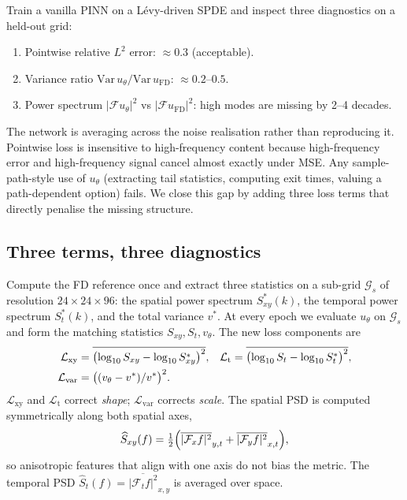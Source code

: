 \documentclass[10pt]{elsarticle}
\begin{document}
Train a vanilla PINN on a L\'evy-driven SPDE and inspect three
diagnostics on a held-out grid:
\begin{enumerate}
\item Pointwise relative \(L^2\) error: \(\approx 0.3\) (acceptable).
\item Variance ratio
\(\mathrm{Var}\,u_\theta / \mathrm{Var}\,u_{\mathrm{FD}}\):
\(\approx 0.2\)--\(0.5\).
\item Power spectrum \(|\mathcal F u_\theta|^2\) vs
\(|\mathcal F u_{\mathrm{FD}}|^2\): high modes are missing by 2--4
decades.
\end{enumerate}
The network is averaging across the noise realisation rather than
reproducing it. Pointwise loss is insensitive to high-frequency
content because high-frequency error and high-frequency signal
cancel almost exactly under MSE. Any sample-path-style use of
\(u_\theta\) (extracting tail statistics, computing exit times,
valuing a path-dependent option) fails. We close this gap by
adding three loss terms that directly penalise the missing
structure.

\subsection{Three terms, three diagnostics}
\label{subsec:losses}

Compute the FD reference once and extract three statistics on a
sub-grid \(\mathcal{G}_s\) of resolution \(24 \times 24 \times 96\):
the spatial power spectrum \(S^*_{xy}(k)\), the temporal power
spectrum \(S^*_t(k)\), and the total variance \(v^*\). At every epoch
we evaluate \(u_\theta\) on \(\mathcal{G}_s\) and form the matching
statistics \(S_{xy}, S_t, v_\theta\). The new loss components are
\begin{align}
\mathcal{L}_{\mathrm{xy}} &=
\overline{\bigl(\log_{10}S_{xy} - \log_{10}S^*_{xy}\bigr)^2}, &
\mathcal{L}_{\mathrm{t}} &=
\overline{\bigl(\log_{10}S_t - \log_{10}S^*_t\bigr)^2}, \notag\\
\mathcal{L}_{\mathrm{var}} &= \bigl((v_\theta - v^*)/v^*\bigr)^2.
\label{eq:losses}
\end{align}
\(\mathcal{L}_{\mathrm{xy}}\) and \(\mathcal{L}_{\mathrm{t}}\)
correct \emph{shape}; \(\mathcal{L}_{\mathrm{var}}\) corrects
\emph{scale}. The spatial PSD is computed symmetrically along both
spatial axes,
\begin{equation}
\widehat S_{xy}(f) = \tfrac12
\Bigl(\overline{|\mathcal F_x f|^2}_{y,t}
+ \overline{|\mathcal F_y f|^2}_{x,t}\Bigr),
\end{equation}
so anisotropic features that align with one axis do not bias the
metric. The temporal PSD
\(\widehat S_t(f) = \overline{|\mathcal F_t f|^2}_{x,y}\) is
averaged over space.
\end{document}
